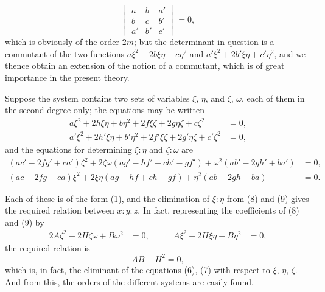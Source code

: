 \documentclass[11pt,a4paper]{book}
\begin{document}
\begin{equation}
\begin{vmatrix}
a & b & a' \\
b & c & b' \\
a' & b' & c'
\end{vmatrix} = 0, \tag{5}
\end{equation}
which is obviously of the order $2m$; but the determinant in question is a commutant of the two functions $a\xi^2 + 2b\xi\eta + c\eta^2$ and $a'\xi^2 + 2b'\xi\eta + c'\eta^2$, and we thence obtain an extension of the notion of a commutant, which is of great importance in the present theory.

Suppose the system contains two sets of variables $\xi$, $\eta$, and $\zeta$, $\omega$, each of them in the second degree only; the equations may be written
\begin{align}
a\xi^2 + 2h\xi\eta + b\eta^2 + 2f\xi\zeta + 2g\eta\zeta + c\zeta^2 &= 0, \tag{6} \\
a'\xi^2 + 2h'\xi\eta + b'\eta^2 + 2f'\xi\zeta + 2g'\eta\zeta + c'\zeta^2 &= 0, \tag{7}
\end{align}
and the equations for determining $\xi : \eta$ and $\zeta : \omega$ are
\begin{align}
(ac' - 2fg' + ca')\zeta^2 + 2\zeta\omega(ag' - hf' + ch' - gf') + \omega^2(ab' - 2gh' + ba') &= 0, \tag{8} \\
(ac - 2fg + ca)\xi^2 + 2\xi\eta(ag - hf + ch - gf) + \eta^2(ab - 2gh + ba) &= 0. \tag{9}
\end{align}

Each of these is of the form (1), and the elimination of $\xi : \eta$ from (8) and (9) gives the required relation between $x : y : z$. In fact, representing the coefficients of (8) and (9) by
\begin{alignat*}{2}
A\zeta^2 + 2H\zeta\omega + B\omega^2 &= 0, \qquad & A\xi^2 + 2H\xi\eta + B\eta^2 &= 0,
\end{alignat*}
the required relation is
\begin{equation}
AB - H^2 = 0, \tag{10}
\end{equation}
which is, in fact, the eliminant of the equations (6), (7) with respect to $\xi$, $\eta$, $\zeta$. And from this, the orders of the different systems are easily found.
\end{document}
